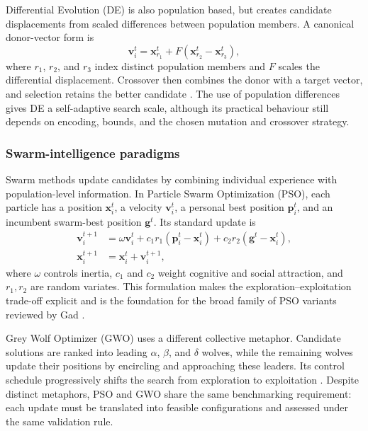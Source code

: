 Differential Evolution (DE) is also population based, but creates candidate displacements from scaled differences between population members. A canonical donor-vector form is
\begin{equation}\label{eq:de_mutation}
\mathbf{v}_{i}^{t} = \mathbf{x}_{r_1}^{t} + F\left(\mathbf{x}_{r_2}^{t} - \mathbf{x}_{r_3}^{t}\right),
\end{equation}
where $r_1$, $r_2$, and $r_3$ index distinct population members and $F$ scales the differential displacement. Crossover then combines the donor with a target vector, and selection retains the better candidate \cite{storn1997de}. The use of population differences gives DE a self-adaptive search scale, although its practical behaviour still depends on encoding, bounds, and the chosen mutation and crossover strategy.

\subsubsection{Swarm-intelligence paradigms}

Swarm methods update candidates by combining individual experience with population-level information. In Particle Swarm Optimization (PSO), each particle has a position $\mathbf{x}_{i}^{t}$, a velocity $\mathbf{v}_{i}^{t}$, a personal best position $\mathbf{p}_{i}^{t}$, and an incumbent swarm-best position $\mathbf{g}^{t}$. Its standard update is
\begin{align}
\mathbf{v}_{i}^{t+1} &= \omega\mathbf{v}_{i}^{t} + c_{1}r_{1}\left(\mathbf{p}_{i}^{t}-\mathbf{x}_{i}^{t}\right) + c_{2}r_{2}\left(\mathbf{g}^{t}-\mathbf{x}_{i}^{t}\right), \label{eq:pso_velocity}\\
\mathbf{x}_{i}^{t+1} &= \mathbf{x}_{i}^{t} + \mathbf{v}_{i}^{t+1}, \label{eq:pso_position}
\end{align}
where $\omega$ controls inertia, $c_{1}$ and $c_{2}$ weight cognitive and social attraction, and $r_{1},r_{2}$ are random variates. This formulation makes the exploration--exploitation trade-off explicit and is the foundation for the broad family of PSO variants reviewed by Gad \cite{kennedy1995pso, gad2022pso_comprehensive}.

Grey Wolf Optimizer (GWO) uses a different collective metaphor. Candidate solutions are ranked into leading $\alpha$, $\beta$, and $\delta$ wolves, while the remaining wolves update their positions by encircling and approaching these leaders. Its control schedule progressively shifts the search from exploration to exploitation \cite{faris2018gwo_review, al_bannoud2026accelerating}. Despite distinct metaphors, PSO and GWO share the same benchmarking requirement: each update must be translated into feasible configurations and assessed under the same validation rule.

